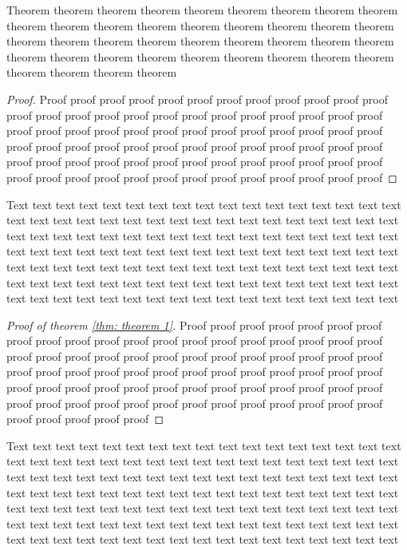 \documentclass{Thesis}
\begin{document}
\begin{theorem}\label{thm: theorem 1}
  Theorem theorem  theorem theorem theorem theorem theorem theorem theorem theorem theorem theorem theorem theorem theorem theorem theorem theorem theorem theorem theorem theorem theorem theorem theorem theorem theorem theorem theorem theorem theorem theorem theorem theorem theorem theorem theorem theorem theorem theorem
\end{theorem}

\begin{proof}
  Proof proof proof proof proof proof proof proof proof proof proof proof proof proof proof proof proof proof proof proof proof proof proof proof proof proof proof proof proof proof proof proof proof proof proof proof proof proof proof proof proof proof proof proof proof proof proof proof proof proof proof proof proof proof proof proof proof proof proof proof proof proof proof proof proof proof proof proof proof proof proof proof proof proof proof proof proof
\end{proof}

Text text text text text text text text text text text text text text text text text text text text text text text text text text text text text text text text text text text text text text text text text text text text text text text text text text text text text text text text text text text text text text text text text text text text text text text text text text text text text text text text text text text text text text text text text text text text text text text text text text text text text text text text text text text text text text text text text text text text text text text

\begin{proof}[Proof of theorem \ref{thm: theorem 1}]
  Proof proof proof proof proof proof proof proof proof proof proof proof proof proof proof proof proof proof proof proof proof proof proof proof proof proof proof proof proof proof proof proof proof proof proof proof proof proof proof proof proof proof proof proof proof proof proof proof proof proof proof proof proof proof proof proof proof proof proof proof proof proof proof proof proof proof proof proof proof proof proof proof proof proof proof proof proof
\end{proof}

Text text text text text text text text text text text text text text text text text text text text text text text text text text text text text text text text text text text text text text text text text text text text text text text text text text text text text text text text text text text text text text text text text text text text text text text text text text text text text text text text text text text text text text text text text text text text text text text text text text text text text text text text text text text text text text text text text text text text text text text
\end{document}
